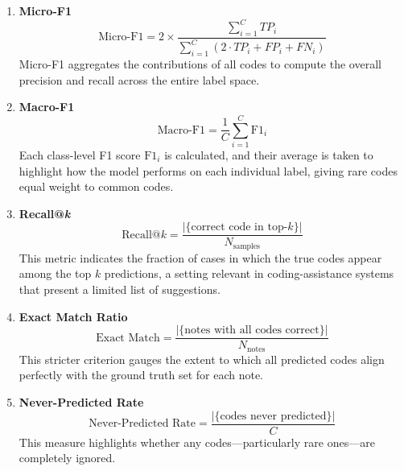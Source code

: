 \begin{enumerate}
    \item \textbf{Micro-F1}
    \begin{equation}\label{eq:p1:micro_f1}
        \text{Micro-F1} = 2 \times 
        \frac{\sum_{i=1}^{C} TP_{i}}
        {\sum_{i=1}^{C} (2 \cdot TP_{i} + FP_{i} + FN_{i})}
    \end{equation}
    Micro-F1 aggregates the contributions of all codes to compute the overall precision and recall across the entire label space.

    \item \textbf{Macro-F1}
    \begin{equation}\label{eq:p1:macro_f1}
        \text{Macro-F1} = \frac{1}{C} \sum_{i=1}^{C} \text{F1}_{i}
    \end{equation}
    Each class-level F1 score $\text{F1}_{i}$ is calculated, and their average is taken to highlight how the model performs on each individual label, giving rare codes equal weight to common codes.

    \item \textbf{Recall@\emph{k}}
    \begin{equation}\label{eq:p1:recall_at_k}
        \text{Recall@}k = 
        \frac{|\{\text{correct code in top-}k\}|}
        {N_{\text{samples}}}
    \end{equation}
    This metric indicates the fraction of cases in which the true codes appear among the top $k$ predictions, a setting relevant in coding-assistance systems that present a limited list of suggestions.

    \item \textbf{Exact Match Ratio}
    \begin{equation}\label{eq:p1:exact_match}
        \text{Exact Match} = 
        \frac{|\{\text{notes with all codes correct}\}|}
        {N_{\text{notes}}}
    \end{equation}
    This stricter criterion gauges the extent to which all predicted codes align perfectly with the ground truth set for each note.

    \item \textbf{Never-Predicted Rate}
    \begin{equation}\label{eq:p1:never_predicted}
        \text{Never-Predicted Rate} = 
        \frac{|\{\text{codes never predicted}\}|}{C}
    \end{equation}
    This measure highlights whether any codes---particularly rare ones---are completely ignored.
\end{enumerate}

